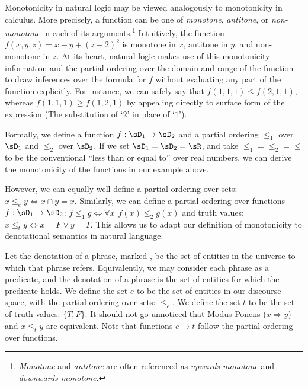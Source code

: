 %
%


Monotonicity in natural logic may be viewed analogously to monotonicity
  in calculus.
More precisely, a function can be one of \textit{monotone},
  \textit{antitone}, or \textit{non-monotone} in each of its
  arguments.\footnote{
    \textit{Monotone} and \textit{antitone} are often referenced
    as \textit{upwards monotone} and \textit{downwards monotone}.
  }
Intuitively, the function $f(x,y,z) = x - y + (z-2)^2$ is
  monotone in $x$, antitone in $y$, and non-monotone in $z$.
At its heart, natural logic makes use of this monotonicity information
  and the partial ordering over the domain and range of the function
  to draw inferences over the formula for $f$ without evaluating
  any part of the function explicitly.
For instance, we can safely say that $f(1,1,1) \leq f(2,1,1)$, whereas
  $f(1,1,1) \geq f(1,2,1)$ by appealing directly to surface form of
  the expression (The substitution of `$2$' in place of `$1$').

Formally, we define a function $f:\sD_1 \rightarrow \sD_2$ and a partial
  ordering $\le_1$ over $\sD_1$ and $\le_2$ over $\sD_2$.
If we set $\sD_1 = \sD_2 = \sR$, and take $\le_1 = \le_2 = \le$ to be
  the conventional ``less than or equal to'' over real numbers,
  we can derive the monotonicity of the functions in our example above.

However, we can equally well define a partial ordering over sets:
  $x \le_e y \Leftrightarrow x \cap y = x$.
Similarly, we can define a partial ordering over functions
  $f : \sD_1 \rightarrow \sD_2$:
  $f \le_1 g \Leftrightarrow \forall x ~~ f(x) \leq_2 g(x)$
  and truth values:
  $x \le_t y \Leftrightarrow x = F \lor y = T$.
This allows us to adapt our definition of monotonicity to denotational
  semantics in natural language.

Let the denotation of a phrase, marked \denote{\cdot}, be the set of
  entities in the universe to which that phrase refers.
Equivalently, we may consider each phrase as a predicate, and the denotation
  of a phrase is the set of entities for which the predicate holds.
We define the set $e$ to be the set of entities in our discourse space,
  with the partial ordering over sets: $\le_e$.
We define the set $t$ to be the set of truth values: $\{T, F\}$.
It should not go unnoticed that Modus Ponens ($x \Rightarrow y$)
  and $x \le_t y$ are equivalent.
Note that functions $e \rightarrow t$ follow the partial ordering over
  functions.

